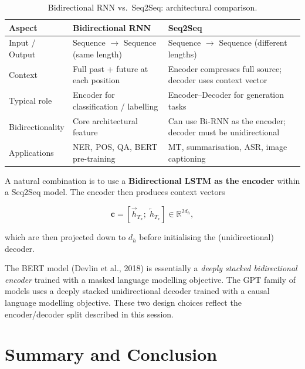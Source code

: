 \documentclass[12pt,a4paper]{article}
\begin{document}
\begin{table}[ht]
\centering
\caption{Bidirectional RNN vs.\ Seq2Seq: architectural comparison.}
\label{tab:birnn_vs_seq2seq}
\begin{tabularx}{\textwidth}{lXX}
\toprule
\textbf{Aspect} & \textbf{Bidirectional RNN} & \textbf{Seq2Seq} \\
\midrule
Input / Output &
  Sequence $\to$ Sequence (same length) &
  Sequence $\to$ Sequence (different lengths) \\
Context &
  Full past + future at each position &
  Encoder compresses full source; decoder uses context vector \\
Typical role &
  Encoder for classification / labelling &
  Encoder--Decoder for generation tasks \\
Bidirectionality &
  Core architectural feature &
  Can use Bi-RNN as the encoder; decoder must be unidirectional \\
Applications &
  NER, POS, QA, BERT pre-training &
  MT, summarisation, ASR, image captioning \\
\bottomrule
\end{tabularx}
\end{table}

A natural combination is to use a \textbf{Bidirectional LSTM as the encoder}
within a Seq2Seq model.  The encoder then produces context vectors

\begin{equation}
  \mathbf{c} = \left[\overrightarrow{h}_{T_x};\;\overleftarrow{h}_{T_x}\right]
              \in \mathbb{R}^{2d_h},
  \label{eq:bienc_context}
\end{equation}

which are then projected down to $d_h$ before initialising the (unidirectional)
decoder.

\begin{keyinsight}
  The BERT model (Devlin et al., 2018) is essentially a \emph{deeply stacked
  bidirectional encoder} trained with a masked language modelling objective.
  The GPT family of models uses a deeply stacked unidirectional decoder trained
  with a causal language modelling objective.  These two design choices reflect
  the encoder/decoder split described in this session.
\end{keyinsight}

\section{Summary and Conclusion}
\label{sec:conclusion}
\end{document}
